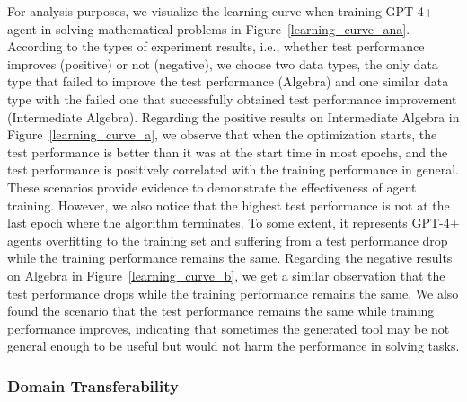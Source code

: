 \documentclass{article}
\theoremstyle{plain}
\theoremstyle{definition}
\theoremstyle{remark}
\begin{document}
For analysis purposes, we visualize the learning curve when training GPT-4+ agent in solving mathematical problems in Figure~\ref{learning_curve_ana}.
According to the types of experiment results, i.e., whether test performance improves (positive) or not (negative), we choose two data types, the only data type that failed to improve the test performance (Algebra) and one similar data type with the failed one that successfully obtained test performance improvement  (Intermediate Algebra).
Regarding the positive results on Intermediate Algebra in Figure~\ref{learning_curve_a}, 
we observe that when the optimization starts, the test performance is better than it was at the start time in most epochs, and the test performance is positively correlated with the training performance in general. These scenarios provide evidence to demonstrate the effectiveness of agent training. 
However, we also notice that the highest test performance is not at the last epoch where the algorithm terminates. 
To some extent, it represents GPT-4+ agents overfitting to the training set and suffering from a test performance drop while the training performance remains the same. 
Regarding the negative results on Algebra in Figure~\ref{learning_curve_b}, we get a similar observation that the test performance drops while the training performance remains the same. 
We also found the scenario that the test performance remains the same while training performance improves, indicating that sometimes the generated tool may be not general enough to be useful but would not harm the performance in solving tasks. 



\subsubsection{Domain  Transferability}
\end{document}
